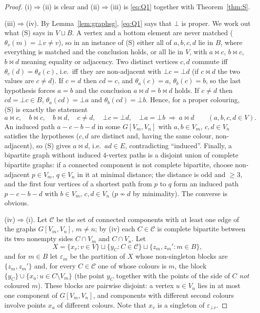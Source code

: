 \documentclass[11pt]{amsart}
\theoremstyle{definition}
\newcommand{\mt}{\bowtie}   %
\begin{document}
\begin{proof}
(i)$\Rightarrow$(ii) is clear and (ii)$\Rightarrow$(iii) is \eqref{eq:Q1} together with Theorem~\ref{thm:S}.

(iii)$\Rightarrow$(iv). By Lemma~\ref{lem:graphsg}, \eqref{eq:Q1} says that $\bot$ is proper. We work out what (S) says in $V\sqcup B$. A vertex and a bottom element are never matched ($\theta_v(m)=\bot v\ne v$), so in an instance of (S) either all of $a,b,c,d$ lie in $B$, where everything is matched and the conclusion holds, or all lie in $V$, with $a\mt c$, $b\mt c$, $b\mt d$ meaning equality or adjacency. Two distinct vertices $c,d$ commute iff $\theta_c(d)=\theta_d(c)$, i.e.\ iff they are non-adjacent with $\bot c=\bot d$ (if $c\mt d$ the two values are $c\ne d$). If $c=d$ then $cd=c$, and $\theta_a(c)=a$, $\theta_b(c)=b$, so the last hypothesis forces $a=b$ and the conclusion $a\mt d=b\mt d$ holds. If $c\ne d$ then $cd=\bot c\in B$, $\theta_a(cd)=\bot a$ and $\theta_b(cd)=\bot b$. Hence, for a proper colouring, (S) is exactly the statement
\[
a\mt c,\quad b\mt c,\quad b\mt d,\quad c\ne d,\quad \bot c=\bot d,\quad \bot a=\bot b\ \Longrightarrow\ a\mt d\qquad(a,b,c,d\in V).
\]
An induced path $a-c-b-d$ in some $G[V_m,V_n]$ with $a,b\in V_m$, $c,d\in V_n$ satisfies the hypotheses ($c,d$ are distinct and, having the same colour, non-adjacent), so (S) gives $a\mt d$, i.e.\ $ad\in E$, contradicting ``induced''. Finally, a bipartite graph without induced $4$-vertex paths is a disjoint union of complete bipartite graphs: if a connected component is not complete bipartite, choose non-adjacent $p\in V_m$, $q\in V_n$ in it at minimal distance; the distance is odd and $\ge3$, and the first four vertices of a shortest path from $p$ to $q$ form an induced path $p-c-b-d$ with $b\in V_m$, $c,d\in V_n$ ($p\not\sim d$ by minimality). The converse is obvious.

(iv)$\Rightarrow$(i). Let $\mathcal C$ be the set of connected components with at least one edge of the graphs $G[V_m,V_n]$, $m\ne n$; by (iv) each $C\in\mathcal C$ is complete bipartite between its two nonempty sides $C\cap V_m$ and $C\cap V_n$. Let
\[
X=\{x_v:v\in V\}\sqcup\{y_C:C\in\mathcal C\}\sqcup\{z_m,z_m':m\in B\},
\]
and for $m\in B$ let $\varepsilon_m$ be the partition of $X$ whose non-singleton blocks are $\{z_m,z_m'\}$ and, for every $C\in\mathcal C$ one of whose colours is $m$, the block $\{y_C\}\cup\{x_u:u\in C\setminus V_m\}$ (the point $y_C$ together with the points of the side of $C$ \emph{not} coloured $m$). These blocks are pairwise disjoint: a vertex $u\in V_n$ lies in at most one component of $G[V_m,V_n]$, and components with different second colours involve points $x_u$ of different colours. Note that $x_v$ is a singleton of $\varepsilon_{\bot v}$.


\end{proof}
\end{document}
